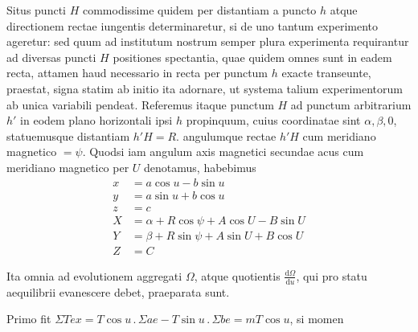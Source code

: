 Situs puncti $H$ commodissime quidem per distantiam a puncto $h$ atque directionem rectae iungentis determinaretur, si de uno tantum experimento ageretur: sed quum ad institutum nostrum semper plura experimenta requirantur ad diversas puncti $H$ positiones spectantia, quae quidem omnes sunt in eadem recta, attamen haud necessario in recta per punctum $h$ exacte transeunte, praestat, signa statim ab initio ita adornare, ut systema talium experimentorum ab unica variabili pendeat. Referemus itaque punctum $H$ ad punctum arbitrarium $h'$ in eodem plano horizontali ipsi $h$ propinquum, cuius coordinatae sint $\alpha,\beta,0$, statuemusque distantiam $h'H=R$. angulumque rectae $h'H$ cum meridiano magnetico $=\psi$. Quodsi iam angulum axis magnetici secundae acus cum meridiano magnetico per $U$ denotamus, habebimus
\[
\begin{aligned}
x&=a\cos u-b\sin u\\
y&=a\sin u+b\cos u\\
z&=c\\
X&=\alpha+R\cos\psi+A\cos U-B\sin U\\
Y&=\beta+R\sin\psi+A\sin U+B\cos U\\
Z&=C
\end{aligned}
\]

Ita omnia ad evolutionem aggregati $\Omega$, atque quotientis $\frac{\mathrm{d}\Omega}{\mathrm{d}u}$, qui pro statu aequilibrii evanescere debet, praeparata sunt.

Primo fit $\Sigma Tex=T\cos u\, .\, \Sigma ae-T\sin u\, .\, \Sigma be=mT\cos u$, si momen%
